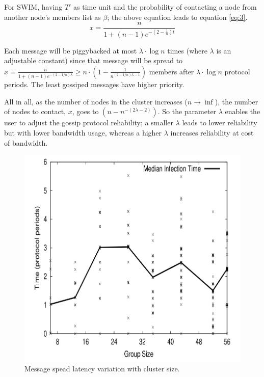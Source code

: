 For SWIM, having $T'$ as time unit and the probability of contacting a node from another node's members list as $\beta$; the above equation leads to equation \ref{eq:3}.
\begin{equation}
\label{eq:3}
   x = \frac{n}{1 + (n - 1)e^{-(2- \frac{1}{n})t}}
\end{equation}

Each message will be piggybacked at most $\lambda \cdot \log n$ times (where $\lambda$ is an adjustable constant) since that message will be spread to $ x = \frac{n}{1 + (n - 1)e^{-(2-1/n)\lambda}} \ge n \cdot (1 - \frac{1}{n^{(2-1/n)\lambda-1}}) $ members after $\lambda \cdot \log n$ protocol periods. The least gossiped messages have higher priority.

All in all, as the number of nodes in the cluster increases ($n \rightarrow \inf$), the number of nodes to contact, $x$, goes to $(n - n^{-(2\lambda - 2)})$\cite{SWIM}. So the parameter $\lambda$ enables the user to adjust the gossip protocol reliability; a smaller $\lambda$ leads to lower reliability but with lower bandwidth usage, whereas a higher $\lambda$ increases reliability at cost of bandwidth.

\begin{figure}[h!]
		\centering
    	\includegraphics[scale=0.25]{assets/images/swim_chart.png}
    	\caption{Message spead latency variation with cluster size. \cite{SWIM}}
    	\label{image:web-milestone2}
\end{figure}

